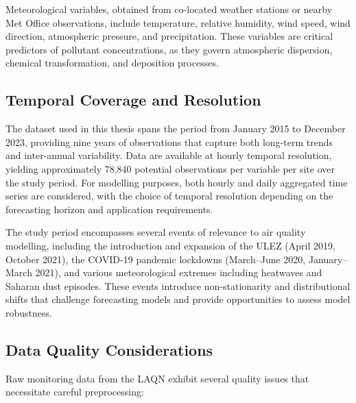 Meteorological variables, obtained from co-located weather stations or nearby Met Office observations, include temperature, relative humidity, wind speed, wind direction, atmospheric pressure, and precipitation. These variables are critical predictors of pollutant concentrations, as they govern atmospheric dispersion, chemical transformation, and deposition processes.

\subsection{Temporal Coverage and Resolution}
\label{subsec:temporal}

The dataset used in this thesis spans the period from January 2015 to December 2023, providing nine years of observations that capture both long-term trends and inter-annual variability. Data are available at hourly temporal resolution, yielding approximately 78,840 potential observations per variable per site over the study period. For modelling purposes, both hourly and daily aggregated time series are considered, with the choice of temporal resolution depending on the forecasting horizon and application requirements.

The study period encompasses several events of relevance to air quality modelling, including the introduction and expansion of the ULEZ (April 2019, October 2021), the COVID-19 pandemic lockdowns (March--June 2020, January--March 2021), and various meteorological extremes including heatwaves and Saharan dust episodes. These events introduce non-stationarity and distributional shifts that challenge forecasting models and provide opportunities to assess model robustness.

\subsection{Data Quality Considerations}
\label{subsec:data_quality}

Raw monitoring data from the LAQN exhibit several quality issues that necessitate careful preprocessing:

